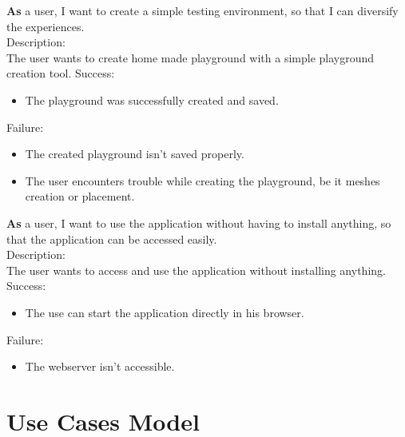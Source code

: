 \documentclass{scrbook}
\begin{document}
\textbf{As} a user, I want to create a simple testing environment, so that I can diversify the experiences. \\
Description:\\
The user wants to create home made playground with a simple playground creation tool.
Success:\\
\begin{itemize}
  \item The playground was successfully created and saved.
\end{itemize}
Failure:\\
\begin{itemize}
  \item The created playground isn't saved properly.
  \item The user encounters trouble while creating the playground, be it meshes creation or placement.
\end{itemize}


\textbf{As} a user, I want to use the application without having to install anything, so that the application can be accessed easily. \\
Description:\\
The user wants to access and use the application without installing anything.
Success:\\
\begin{itemize}
  \item The use can start the application directly in his browser.
\end{itemize}
Failure:\\
\begin{itemize}
  \item The webserver isn't accessible.
\end{itemize}

\section{Use Cases Model}
\end{document}
